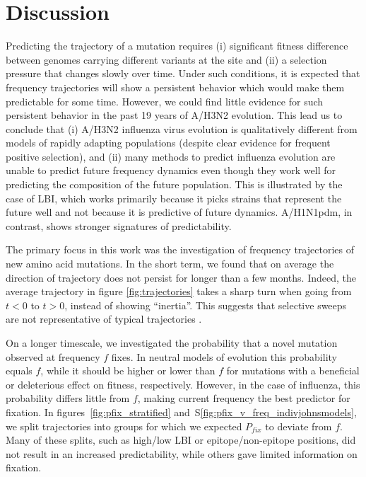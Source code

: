 \documentclass[reprint,amsmath,amssymb,superscriptaddress,showpacs,rmp]{revtex4-1}
\newcommand{\sref}[1]{S\ref{#1}}
\begin{document}

\section*{Discussion} %
\label{sec:discussion}

Predicting the trajectory of a mutation requires (i) significant fitness difference between genomes carrying different variants at the site and (ii) a selection pressure that changes slowly over time.
Under such conditions, it is expected that frequency trajectories will show a persistent behavior which would make them predictable for some time.
However, we could find little evidence for such persistent behavior in the past 19 years of A/H3N2 evolution.
This lead us to conclude that (i) A/H3N2 influenza virus evolution is qualitatively different from models of rapidly adapting populations (despite clear evidence for frequent positive selection), and (ii) many methods to predict influenza evolution are unable to predict future frequency dynamics even though they work well for predicting the composition of the future population.
This is illustrated by the case of LBI, which works primarily because it picks strains that represent the future well and not because it is predictive of future dynamics.
A/H1N1pdm, in contrast, shows stronger signatures of predictability.

The primary focus in this work was the investigation of frequency trajectories of new amino acid mutations.
In the short term, we found that on average the direction of trajectory does not persist for longer than a few months.
Indeed, the average trajectory in figure \ref{fig:trajectories} takes a sharp turn when going from $t<0$ to $t>0$, instead of showing ``inertia''.
This suggests that selective sweeps are not representative of typical trajectories \citep{illingworth_components_2012}.

On a longer timescale, we investigated the probability that a novel mutation observed at frequency $f$ fixes.
In neutral models of evolution this probability equals $f$, while it should be higher or lower than $f$ for mutations with a beneficial or deleterious effect on fitness, respectively.
However, in the case of influenza, this probability differs little from $f$, making current frequency the best predictor for fixation.
In figures~\ref{fig:pfix_stratified} and~\sref{fig:pfix_v_freq_indivjohnsmodels}, we split trajectories into groups for which we expected $P_{fix}$ to deviate from $f$.
Many of these splits, such as high/low LBI or epitope/non-epitope positions, did not result in an increased predictability, while others gave limited information on fixation.
\end{document}
